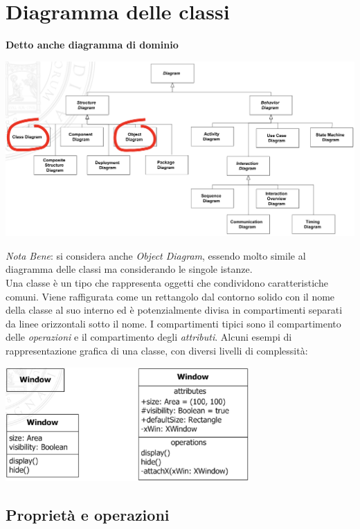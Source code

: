 \documentclass{article}
\begin{document}
\pagestyle{empty}

\section*{Diagramma delle classi}
\large

\textbf{Detto anche diagramma di dominio}
\begin{center}
    \includegraphics[width=1\textwidth]{foto 1.png}
\end{center}
\textit{Nota Bene}: si considera anche \textit{Object Diagram}, essendo molto simile al diagramma delle classi ma considerando le singole istanze. \vspace{14pt}\\
Una classe è un tipo che rappresenta oggetti che condividono caratteristiche comuni.
Viene raffigurata come un rettangolo dal contorno solido con il nome della classe al suo interno ed è potenzialmente divisa in compartimenti separati da linee orizzontali sotto il nome.
I compartimenti tipici sono il compartimento delle \textit{operazioni} e il compartimento degli \textit{attributi}.
Alcuni esempi di rappresentazione grafica di una classe, con diversi livelli di complessità:
\begin{center}
    \includegraphics[width=0.7\textwidth]{foto 2.png}
\end{center}

\subsection*{Proprietà e operazioni}
\large
\end{document}
